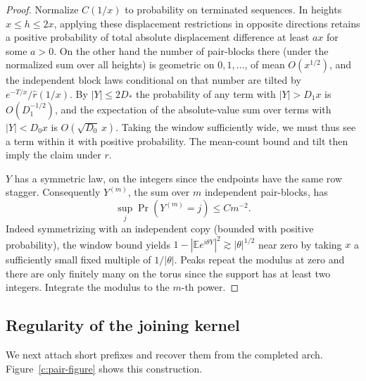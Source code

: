 \documentclass[11pt]{article}
\numberwithin{equation}{section}
\theoremstyle{definition}\newtheorem{definition}[theorem]{Definition}
\theoremstyle{remark}\newtheorem{remark}[theorem]{Remark}
\begin{document}
\begin{proof}
Normalize \(C(1/x)\) to probability on terminated sequences. In heights \(x\le h\le 2x\), applying these displacement restrictions in opposite directions retains a positive probability of total absolute displacement difference at least \(a x\) for some \(a>0\). On the other hand the number of pair-blocks there (under the normalized sum over all heights) is geometric on \(0,1,\dots\), of mean \(O(x^{1/2})\), and the independent block laws conditional on that number are tilted by \(e^{-T/x}/\hat r(1/x)\). By \(|Y|\le2D_*\) the probability of any term with \(|Y|>D_1x\) is \(O(D_1^{-1/2})\), and the expectation of the absolute-value sum over terms with \(|Y|<D_0 x\) is \(O(\sqrt{D_0}\,x)\). Taking the window sufficiently wide, we must thus see a term within it with positive probability. The mean-count bound and tilt then imply the claim under \(r\).



\(Y\) has a symmetric law, on the integers since the endpoints have the same row stagger. Consequently \(Y^{(m)}\), the sum over \(m\) independent pair-blocks, has
\[
 \sup_j\Pr(Y^{(m)}=j)\le C m^{-2}.
\]
Indeed symmetrizing with an independent copy (bounded with positive probability), the window bound yields \(1-|\mathbb E e^{i\theta Y}|^2\gtrsim |\theta|^{1/2}\) near zero by taking \(x\) a sufficiently small fixed multiple of \(1/|\theta|\). Peaks repeat the modulus at zero and there are only finitely many on the torus since the support has at least two integers. Integrate the modulus to the \(m\)-th power.
\end{proof}

\subsection{Regularity of the joining kernel}
We next attach short prefixes and recover them from the completed arch.
Figure~\ref{c:pair-figure} shows this construction.
\end{document}
